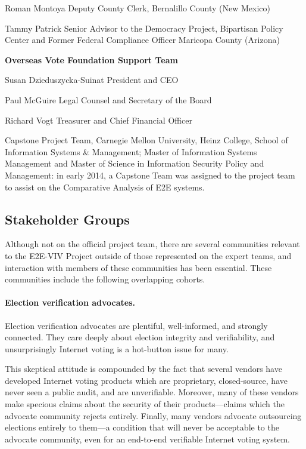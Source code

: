 Roman Montoya
Deputy County Clerk, Bernalillo County (New Mexico)
 
Tammy Patrick
Senior Advisor to the Democracy Project, Bipartisan Policy Center and Former Federal Compliance Officer Maricopa County (Arizona)
 
\textbf{Overseas Vote Foundation Support Team}

Susan Dzieduszycka-Suinat
President and CEO
 
Paul McGuire
Legal Counsel and Secretary of the Board
 
Richard Vogt
Treasurer and Chief Financial Officer

Capstone Project Team, Carnegie Mellon University, Heinz College,
School of Information Systems \& Management; Master of Information
Systems Management and Master of Science in Information Security
Policy and Management: in early 2014, a Capstone Team was assigned to
the project team to assist on the Comparative Analysis of E2E systems.

\subsection{Stakeholder Groups}
\label{sec:stakeholder-groups}

Although not on the official project team, there are several
communities relevant to the E2E-VIV Project outside of those
represented on the expert teams, and interaction with members of these
communities has been essential. These communities include the
following overlapping cohorts.

\paragraph{Election verification advocates.} Election verification
advocates are plentiful, well-informed, and strongly connected.  They
care deeply about election integrity and verifiability, and
unsurprisingly Internet voting is a hot-button issue for many.

This skeptical attitude is compounded by the fact that several vendors
have developed Internet voting products which are proprietary,
closed-source, have never seen a public audit, and are
unverifiable. Moreover, many of these vendors make specious claims
about the security of their products---claims which the advocate
community rejects entirely. Finally, many vendors advocate outsourcing
elections entirely to them---a condition that will never be acceptable
to the advocate community, even for an end-to-end verifiable Internet
voting system.


